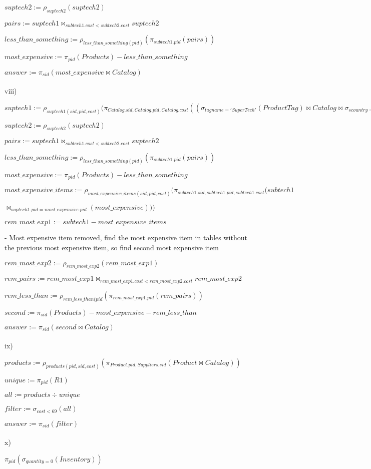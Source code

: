 \documentclass[10pt]{article}
\begin{document}
$suptech2 := \rho_{suptech2}(suptech2)$

$pairs := suptech1 \bowtie_{subtech1.cost < subtech2.cost} suptech2$

$less\_than\_something := \rho_{less\_than\_something(pid)}(\pi_{subtech1.pid}(pairs))$

$most\_expensive := \pi_{pid}(Products) - less\_than\_something$

$answer := \pi_{sid}(most\_expensive \bowtie Catalog)$
\\~\\
viii)

$suptech1 := \rho_{suptech1(sid, pid, cost)}(\pi_{Catalog.sid, Catalog.pid, Catalog.cost}((\sigma_{tagname = 'Super Tech'}(ProductTag) \bowtie Catalog \bowtie \sigma_{scountry = 'USA'}(Suppliers)))$

$suptech2 := \rho_{suptech2}(suptech2)$

$pairs := suptech1 \bowtie_{subtech1.cost < subtech2.cost} suptech2$

$less\_than\_something := \rho_{less\_than\_something(pid)}(\pi_{subtech1.pid}(pairs))$

$most\_expensive := \pi_{pid}(Products) - less\_than\_something$

$most\_expensive\_items := \rho_{most\_expensive\_items(sid, pid, cost)}(\pi_{subtech1.sid, subtech1.pid, subtech1.cost}(subtech1 $

$\bowtie_{suptech1.pid = most\_expensive.pid}(most\_expensive)))$

$rem\_most\_exp1 := subtech1 - most\_expensive\_items$

- Most expensive item removed, find the most expensive item in tables without the previous most expensive item, so find second most expensive item

$rem\_most\_exp2 := \rho_{rem\_most\_exp2}(rem\_most\_exp1)$

$rem\_pairs := rem\_most\_exp1 \bowtie_{rem\_most\_exp1.cost < rem\_most\_exp2.cost} rem\_most\_exp2$

$rem\_less\_than := \rho_{rem\_less\_than(pid}(\pi_{rem\_most\_exp1.pid}(rem\_pairs))$

$second := \pi_{sid}(Products) - most\_expensive - rem\_less\_than$

$answer := \pi_{sid}(second \bowtie Catalog)$
\\~\\
ix)

$products := \rho_{products(pid, sid, cost)}(\pi_{Product.pid, Suppliers.sid}(Product \bowtie Catalog))$

$unique := \pi_{pid}(R1)$

$all := products \div unique$

$filter := \sigma_{cost<69}(all)$

$answer := \pi_{sid}(filter)$
\\~\\
x)

$\pi_{pid}(\sigma_{quantity=0}(Inventory))$
\end{document}
